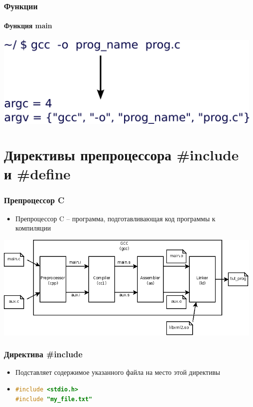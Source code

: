 \documentclass[12pt,pdf,hyperref={unicode}]{beamer}
\begin{document}
\begin{frame}[fragile]
\frametitle{Функции} 
\framesubtitle{Функция main}
\begin{center}
\includegraphics[width=1.0\linewidth]{images/function_argcargv.png}
\end{center}
\end{frame}
\fi

\iffalse
\section{Директивы препроцессора \#include и \#define}


\begin{frame}[fragile]
\frametitle{Препроцессор C} 
\begin{itemize}
\item Препроцессор C -- программа, подготавливающая код программы к компиляции
\end{itemize}
\begin{center}
\includegraphics[width=0.95\linewidth]{images/compilation-stages.png}
\end{center}
\end{frame}


\begin{frame}[fragile]
\frametitle{Директива \#include} 
\begin{itemize}
\item Подставляет содержимое указанного файла на место этой директивы
\item \begin{lstlisting}[language=C,basicstyle=\ttfamily,keywordstyle=\color{blue}]
#include <stdio.h>
#include "my_file.txt"
\end{lstlisting}
\end{itemize}
\end{frame}
\end{document}
